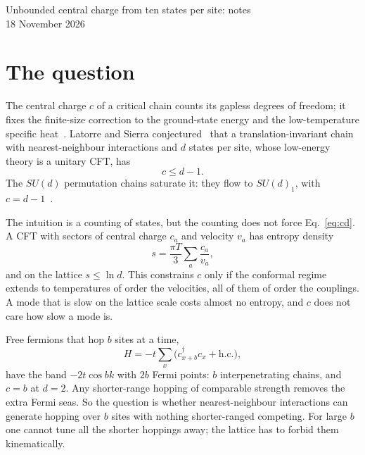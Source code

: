 \documentclass[11pt]{article}
\newcommand{\hc}{\mathrm{h.c.}}
\begin{document}
\begin{center}
{\Large Unbounded central charge from ten states per site: notes}\\[6pt]
18 November 2026
\end{center}

\section{The question}

The central charge $c$ of a critical chain counts its gapless degrees of freedom; it fixes the finite-size correction to the ground-state energy and the low-temperature specific heat~\cite{BloteCardyNightingale,Affleck86}. Latorre and Sierra conjectured~\cite{LatorreSierra} that a translation-invariant chain with nearest-neighbour interactions and $d$ states per site, whose low-energy theory is a unitary CFT, has
\begin{equation}
c\le d-1 .
\label{eq:cd}
\end{equation}
The $SU(d)$ permutation chains saturate it: they flow to $SU(d)_1$, with $c=d-1$~\cite{Sutherland,AffleckNPB}.

The intuition is a counting of states, but the counting does not force Eq.~\eqref{eq:cd}. A CFT with sectors of central charge $c_a$ and velocity $v_a$ has entropy density
\begin{equation}
s=\frac{\pi T}{3}\sum_a\frac{c_a}{v_a},
\label{eq:entropy}
\end{equation}
and on the lattice $s\le\ln d$. This constrains $c$ only if the conformal regime extends to temperatures of order the velocities, all of them of order the couplings. A mode that is slow on the lattice scale costs almost no entropy, and $c$ does not care how slow a mode is.

Free fermions that hop $b$ sites at a time,
\begin{equation}
H=-t\sum_x\big(c^\dagger_{x+b}c_x+\hc\big),
\label{eq:bhop}
\end{equation}
have the band $-2t\cos bk$ with $2b$ Fermi points: $b$ interpenetrating chains, and $c=b$ at $d=2$. Any shorter-range hopping of comparable strength removes the extra Fermi seas. So the question is whether nearest-neighbour interactions can generate hopping over $b$ sites with nothing shorter-ranged competing. For large $b$ one cannot tune all the shorter hoppings away; the lattice has to forbid them kinematically.
\end{document}

